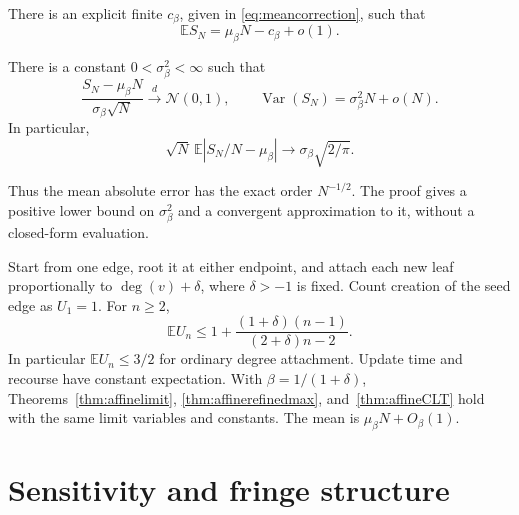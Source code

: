 \documentclass[runningheads,envcountsame,orivec]{llncs}
\newcommand{\E}{\mathbb E}
\begin{document}
\begin{theorem}\label{thm:affinetotal}
There is an explicit finite $c_\beta$, given in
\eqref{eq:meancorrection}, such that
\begin{equation}\label{eq:affinetotal}
 \E S_N=\mu_\beta N-c_\beta+o(1).
\end{equation}
\end{theorem}

\begin{theorem}\label{thm:affineCLT}
There is a constant $0<\sigma_\beta^2<\infty$ such that
\begin{equation}\label{eq:fullPAclt}
 \frac{S_N-\mu_\beta N}{\sigma_\beta\sqrt N}
 \xrightarrow{d}\mathcal N(0,1),\qquad
 \operatorname{Var}(S_N)=\sigma_\beta^2N+o(N).
\end{equation}
In particular,
\begin{equation}\label{eq:CLTabsmean}
 \sqrt N\,\E|S_N/N-\mu_\beta|
 \longrightarrow\sigma_\beta\sqrt{2/\pi}.
\end{equation}
\end{theorem}
Thus the mean absolute error has the exact order $N^{-1/2}$.
The proof gives a positive lower bound on $\sigma_\beta^2$ and a
convergent approximation to it, without a closed-form evaluation.

\begin{corollary}\label{cor:degree}
Start from one edge, root it at either endpoint, and attach each new
leaf proportionally to $\deg(v)+\delta$, where $\delta>-1$ is fixed.
Count creation of the seed edge as $U_1=1$.
For $n\ge2$,
\begin{equation}\label{eq:degreemean}
 \E U_n\le1+\frac{(1+\delta)(n-1)}{(2+\delta)n-2}.
\end{equation}
In particular $\E U_n\le3/2$ for ordinary degree attachment.
Update time and recourse have constant expectation. With
$\beta=1/(1+\delta)$, Theorems~\ref{thm:affinelimit},
\ref{thm:affinerefinedmax}, and~\ref{thm:affineCLT} hold with the same
limit variables and constants. The mean is $\mu_\beta N+O_\beta(1)$.
\end{corollary}

\section{Sensitivity and fringe structure}\label{sec:sensitivity}
\end{document}
